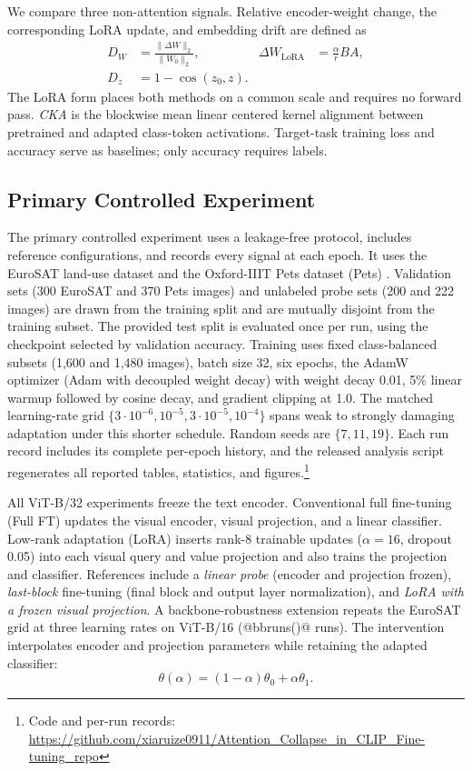 \documentclass[conference]{IEEEtran}
\begin{document}
We compare three non-attention signals. Relative encoder-weight change, the corresponding LoRA update, and embedding drift are defined as
\begin{align}
D_W &= \frac{\lVert\Delta W\rVert_2}{\lVert W_0\rVert_2},
& \Delta W_{\mathrm{LoRA}} &= \frac{\alpha}{r}BA, \\
D_z &= 1-\cos(z_0,z).
\end{align}
The LoRA form places both methods on a common scale and requires no forward pass. \emph{CKA} is the blockwise mean linear centered kernel alignment \cite{kornblith2019similarity} between pretrained and adapted class-token activations. Target-task training loss and accuracy serve as baselines; only accuracy requires labels.

\subsection{Primary Controlled Experiment}
The primary controlled experiment uses a leakage-free protocol, includes reference configurations, and records every signal at each epoch. It uses the EuroSAT land-use dataset \cite{helber2019eurosat} and the Oxford-IIIT Pets dataset (Pets) \cite{parkhi2012cats}. Validation sets (300 EuroSAT and 370 Pets images) and unlabeled probe sets (200 and 222 images) are drawn from the training split and are mutually disjoint from the training subset. The provided test split is evaluated once per run, using the checkpoint selected by validation accuracy. Training uses fixed class-balanced subsets (1{,}600 and 1{,}480 images), batch size 32, six epochs, the AdamW optimizer (Adam with decoupled weight decay) with weight decay 0.01, 5\% linear warmup followed by cosine decay, and gradient clipping at 1.0. The matched learning-rate grid $\{3\cdot 10^{-6},10^{-5},3\cdot 10^{-5},10^{-4}\}$ spans weak to strongly damaging adaptation under this shorter schedule. Random seeds are $\{7,11,19\}$. Each run record includes its complete per-epoch history, and the released analysis script regenerates all reported tables, statistics, and figures.\footnote{Code and per-run records: \url{https://github.com/xiaruize0911/Attention_Collapse_in_CLIP_Fine-tuning_repo}}

All ViT-B/32 experiments freeze the text encoder. Conventional full fine-tuning (Full FT) updates the visual encoder, visual projection, and a linear classifier. Low-rank adaptation (LoRA) inserts rank-8 trainable updates ($\alpha=16$, dropout 0.05) into each visual query and value projection and also trains the projection and classifier. References include a \emph{linear probe} (encoder and projection frozen), \emph{last-block} fine-tuning (final block and output layer normalization), and \emph{LoRA with a frozen visual projection}. A backbone-robustness extension repeats the EuroSAT grid at three learning rates on ViT-B/16 (@bbruns()@ runs). The intervention interpolates encoder and projection parameters while retaining the adapted classifier:
\begin{equation}
\theta(\alpha)=(1-\alpha)\theta_0+\alpha\theta_1.
\end{equation}
\end{document}
